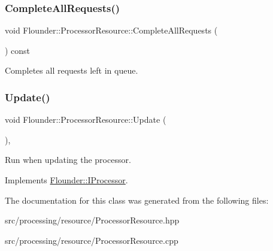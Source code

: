 \subsubsection{\texorpdfstring{Complete\+All\+Requests()}{CompleteAllRequests()}}
{\footnotesize\ttfamily void Flounder\+::\+Processor\+Resource\+::\+Complete\+All\+Requests (\begin{DoxyParamCaption}{ }\end{DoxyParamCaption}) const}



Completes all requests left in queue. 

\mbox{\label{class_flounder_1_1_processor_resource_a1167c01d0a317a054211972ea32e09cd}} 
\subsubsection{\texorpdfstring{Update()}{Update()}}
{\footnotesize\ttfamily void Flounder\+::\+Processor\+Resource\+::\+Update (\begin{DoxyParamCaption}{ }\end{DoxyParamCaption})\hspace{0.3cm}{\ttfamily [override]}, {\ttfamily [virtual]}}



Run when updating the processor. 



Implements \hyperlink{class_flounder_1_1_i_processor_ade1b8614d9e1b62ad66887426701a5d4}{Flounder\+::\+I\+Processor}.



The documentation for this class was generated from the following files\+:\begin{DoxyCompactItemize}
\item 
src/processing/resource/Processor\+Resource.\+hpp\item 
src/processing/resource/Processor\+Resource.\+cpp\end{DoxyCompactItemize}
